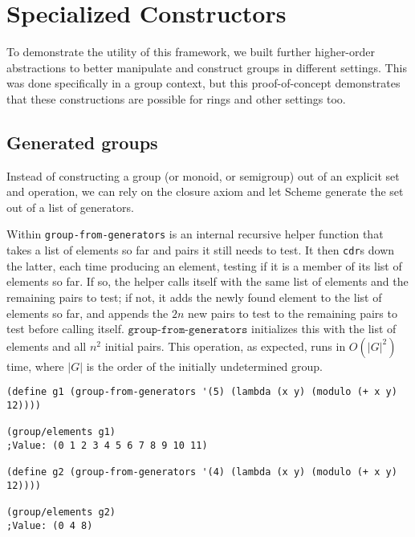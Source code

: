 \documentclass{article}
\begin{document}
    
    
    \section{Specialized Constructors}
        
        To demonstrate the utility of this framework, we built further higher-order abstractions to better manipulate and construct groups in different settings. This was done specifically in a group context, but this proof-of-concept demonstrates that these constructions are possible for rings and other settings too.
        
        \subsection{Generated groups}
        \label{generated-groups}
        
            Instead of constructing a group (or monoid, or semigroup) out of an explicit set and operation, we can rely on the closure axiom and let Scheme generate the set out of a list of generators.
            
             Within \texttt{group-from-generators} is an internal recursive helper function that takes a list of elements so far and pairs it still needs to test. It then \texttt{cdr}s down the latter, each time producing an element, testing if it is a member of its list of elements so far. If so, the helper calls itself with the same list of elements and the remaining pairs to test; if not, it adds the newly found element to the list of elements so far, and appends the $2n$ new pairs to test to the remaining pairs to test before calling itself. $\texttt{group-from-generators}$ initializes this with the list of elements and all $n^2$ initial pairs. This operation, as expected, runs in $O(|G|^2)$ time, where $|G|$ is the order of the initially undetermined group. 
         
\begin{verbatim}
(define g1 (group-from-generators '(5) (lambda (x y) (modulo (+ x y) 12))))

(group/elements g1)
;Value: (0 1 2 3 4 5 6 7 8 9 10 11)

(define g2 (group-from-generators '(4) (lambda (x y) (modulo (+ x y) 12))))

(group/elements g2)
;Value: (0 4 8)
\end{verbatim}
         
\end{document}
